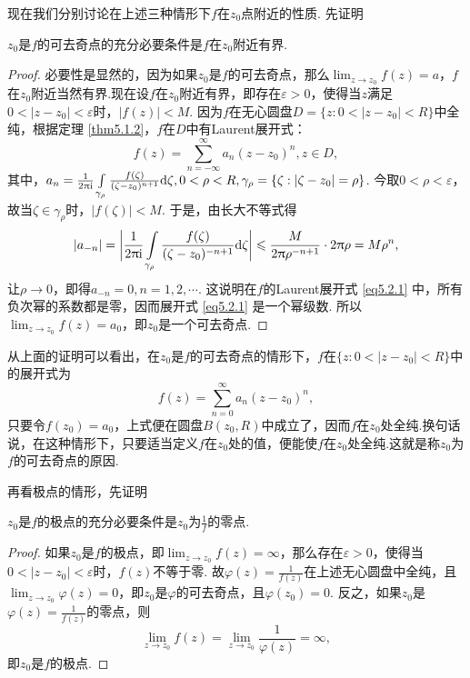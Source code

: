 现在我们分别讨论在上述三种情形下$f$在$z_0$点附近的性质. 先证明
\begin{theorem}\label{thm5.2.1}
$z_0$是$f$的可去奇点的充分必要条件是$f$在$z_0$附近有界.
\end{theorem}
\begin{proof}
必要性是显然的，因为如果$z_0$是$f$的可去奇点，那么$\lim_{z\to z_0}f(z)=a$，$f$在$z_0$附近当然有界.现在设$f$在$z_0$附近有界，即存在$\varepsilon>0$，使得当$z$满足$0<|z-z_0|<\varepsilon$时，$|f(z)|<M$. 因为$f$在无心圆盘$D=\{z:0<|z-z_0|<R\}$中全纯，根据定理 \ref{thm5.1.2}，$f$在$D$中有Laurent展开式：
\begin{equation}\label{eq5.2.1}
f(z)=\sum_{n=-\infty}^\infty a_n(z-z_0)^n,z\in D,
\end{equation}
其中，$a_n=\frac1{2\uppi\mathrm i}\int\limits_{\gamma_\rho}\frac{f(\zeta)}{(\zeta-z_0)^{n+1}}
\textrm d\zeta,0<\rho<R,\gamma_{\rho}=\{\zeta:|\zeta-z_0|=\rho\}$. 今取$0<\rho<\varepsilon$，故当$\zeta\in\gamma_\rho$时，$|f(\zeta)|<M$. 于是，由长大不等式得
\[|a_{-n}|=\bigg|\frac1{2\uppi\mathrm i}\int\limits_{\gamma_\rho}
\frac{f(\zeta)}{(\zeta-z_0)^{-n+1}}\textrm d\zeta\bigg|\leqslant
\frac M{2\uppi\rho^{-n+1}}\cdot2\uppi\rho=M\rho^n,\]
让$\rho\to0$，即得$a_{-n}=0,n=1,2,\cdots$. 这说明在$f$的Laurent展开式 \eqref{eq5.2.1} 中，所有负次幂的系数都是零，因而展开式 \eqref{eq5.2.1} 是一个幂级数. 所以$\lim_{z\to z_0}f(z)=a_0$，即$z_0$是一个可去奇点.
\end{proof}

从上面的证明可以看出，在$z_0$是$f$的可去奇点的情形下，$f$在$\{z:0<|z-z_0|<R\}$中的展开式为
\[f(z)=\sum_{n=0}^\infty a_n(z-z_0)^n,\]
只要令$f(z_0)=a_0$，上式便在圆盘$B(z_0,R)$中成立了，因而$f$在$z_0$处全纯.换句话说，在这种情形下，只要适当定义$f$在$z_0$处的值，便能使$f$在$z_0$处全纯.这就是称$z_0$为$f$的可去奇点的原因.

再看极点的情形，先证明
\begin{prop}\label{prop5.2.2}
$z_0$是$f$的极点的充分必要条件是$z_0$为$\frac1f$的零点.
\end{prop}
\begin{proof}
如果$z_0$是$f$的极点，即$\lim_{z\to z_0}f(z)=\infty$，那么存在$\varepsilon>0$，使得当$0<|z-z_0|<\varepsilon$时，$f(z)$不等于零. 故$\varphi(z)=\frac1{f(z)}$在上述无心圆盘中全纯，且$\lim_{z\to z_0}\varphi(z)=0$，即$z_0$是$\varphi$的可去奇点，且$\varphi(z_0)=0$. 反之，如果$z_0$是$\varphi(z)=\frac1{f(z)}$的零点，则
\[\lim_{z\to z_0}f(z)=\lim_{z\to z_0}\frac1{\varphi(z)}=\infty,\]
即$z_0$是$f$的极点.
\end{proof}

